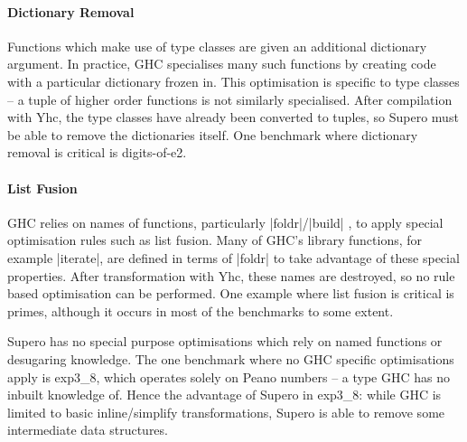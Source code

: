 \documentclass{llncs}
\begin{document}
\paragraph{Dictionary Removal} Functions which make use of type classes are given an additional dictionary argument. In practice, GHC specialises many such functions by creating code with a particular dictionary frozen in. This optimisation is specific to type classes -- a tuple of higher order functions is not similarly specialised. After compilation with Yhc, the type classes have already been converted to tuples, so Supero must be able to remove the dictionaries itself. One benchmark where dictionary removal is critical is digits-of-e2.

\paragraph{List Fusion} GHC relies on names of functions, particularly |foldr|/|build| \cite{spj:rules}, to apply special optimisation rules such as list fusion. Many of GHC's library functions, for example |iterate|, are defined in terms of |foldr| to take advantage of these special properties. After transformation with Yhc, these names are destroyed, so no rule based optimisation can be performed. One example where list fusion is critical is primes, although it occurs in most of the benchmarks to some extent.

Supero has no special purpose optimisations which rely on named functions or desugaring knowledge. The one benchmark where no GHC specific optimisations apply is exp3\_8, which operates solely on Peano numbers -- a type GHC has no inbuilt knowledge of. Hence the advantage of Supero in exp3\_8: while GHC is limited to basic inline/simplify transformations, Supero is able to remove some intermediate data structures.
\end{document}
